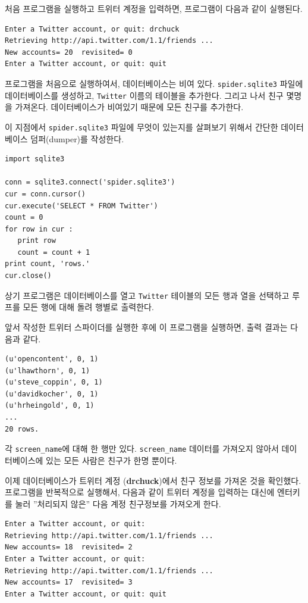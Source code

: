 처음 프로그램을 실행하고 트위터 계정을 입력하면, 프로그램이 다음과 같이 실행된다.

\beforeverb
\begin{verbatim}
Enter a Twitter account, or quit: drchuck
Retrieving http://api.twitter.com/1.1/friends ...
New accounts= 20  revisited= 0
Enter a Twitter account, or quit: quit
\end{verbatim}
\afterverb
%

프로그램을 처음으로 실행하여서, 데이터베이스는 비여 있다. 
{\tt spider.sqlite3} 파일에 데이터베이스를 생성하고, {\tt Twitter} 이름의 테이블을 추가한다.
그리고 나서 친구 몇명을 가져온다.
데이터베이스가 비여있기 때문에 모든 친구를 추가한다.

이 지점에서 {\tt spider.sqlite3} 파일에 무엇이 있는지를 살펴보기 위해서 간단한 데이터베이스 덤퍼(dumper)를 작성한다.

\beforeverb
\begin{verbatim}
import sqlite3

conn = sqlite3.connect('spider.sqlite3')
cur = conn.cursor()
cur.execute('SELECT * FROM Twitter')
count = 0
for row in cur :
   print row
   count = count + 1
print count, 'rows.'
cur.close()
\end{verbatim}
\afterverb
%

상기 프로그램은 데이터베이스를 열고 {\tt Twitter} 테이블의 모든 행과 열을 선택하고 
루프를 모든 행에 대해 돌려 행별로 출력한다.

앞서 작성한 트위터 스파이더를 실행한 후에 이 프로그램을 실행하면, 출력 결과는 다음과 같다.

\beforeverb
\begin{verbatim}
(u'opencontent', 0, 1)
(u'lhawthorn', 0, 1)
(u'steve_coppin', 0, 1)
(u'davidkocher', 0, 1)
(u'hrheingold', 0, 1)
...
20 rows.
\end{verbatim}
\afterverb
%

각 \verb"screen_name"에 대해 한 행만 있다. 
\verb"screen_name" 데이터를 가져오지 않아서 데이터베이스에 있는 모든 사람은 친구가 한명 뿐이다.

이제 데이터베이스가 트위터 계정 ({\bf drchuck})에서 친구 정보를 가져온 것을 확인했다.
프로그램을 반복적으로 실행해서, 
다음과 같이 트위터 계정을 입력하는 대신에 엔터키를 눌러 ''처리되지 않은'' 다음 계정 친구정보를 가져오게 한다.

\beforeverb
\begin{verbatim}
Enter a Twitter account, or quit: 
Retrieving http://api.twitter.com/1.1/friends ...
New accounts= 18  revisited= 2
Enter a Twitter account, or quit: 
Retrieving http://api.twitter.com/1.1/friends ...
New accounts= 17  revisited= 3
Enter a Twitter account, or quit: quit
\end{verbatim}
\afterverb
%

